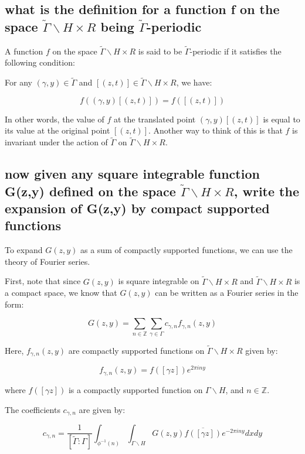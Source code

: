 \documentclass[12pt,a4paper,english]{article}
\theoremstyle{plain}
\theoremstyle{definition}
\theoremstyle{remark}
\begin{document}
\subsection{what is the definition for a function f on the space $\tilde{\Gamma}\backslash H\times R$ being $\tilde{\Gamma}$-periodic}

A function $f$ on the space $\tilde{\Gamma}\backslash H \times R$ is said to be $\tilde{\Gamma}$-periodic if it satisfies the following condition:

For any $(\gamma,y) \in \tilde{\Gamma}$ and $[(z,t)] \in \tilde{\Gamma}\backslash H \times R$, we have:

$$f((\gamma, y) [(z, t)]) = f([(z,t)])$$

In other words, the value of $f$ at the translated point $(\gamma, y) [(z,t)]$ is equal to its value at the original point $[(z,t)]$. Another way to think of this is that $f$ is invariant under the action of $\tilde{\Gamma}$ on $\tilde{\Gamma}\backslash H \times R$.

\subsection{
now given any square integrable function G(z,y) defined on the space $\tilde{\Gamma}\backslash H\times R$, write the expansion of G(z,y) by compact supported functions}

To expand $G(z,y)$ as a sum of compactly supported functions, we can use the theory of Fourier series.

First, note that since $G(z,y)$ is square integrable on $\tilde{\Gamma}\backslash H \times R$ and $\tilde{\Gamma}\backslash H \times R$ is a compact space, we know that $G(z,y)$ can be written as a Fourier series in the form:

$$G(z,y) = \sum_{n\in \mathbb{Z}} \sum_{\gamma\in \Gamma} c_{\gamma,n} f_{\gamma,n}(z,y)$$

Here, $f_{\gamma,n}(z,y)$ are compactly supported functions on $\tilde{\Gamma}\backslash H \times R$ given by:

$$f_{\gamma,n}(z,y) = f([\gamma z]) e^{2\pi i n y}$$

where $f([\gamma z])$ is a compactly supported function on $\Gamma\backslash H$, and $n \in \mathbb{Z}$.

The coefficients $c_{\gamma,n}$ are given by:

$$c_{\gamma,n} = \frac{1}{[\tilde{\Gamma}:\Gamma]}\int_{\phi^{-1}(n)}\int_{\Gamma\backslash H} G(z,y) \overline{f([\gamma z])} e^{-2\pi i n y} dxdy$$
\end{document}
